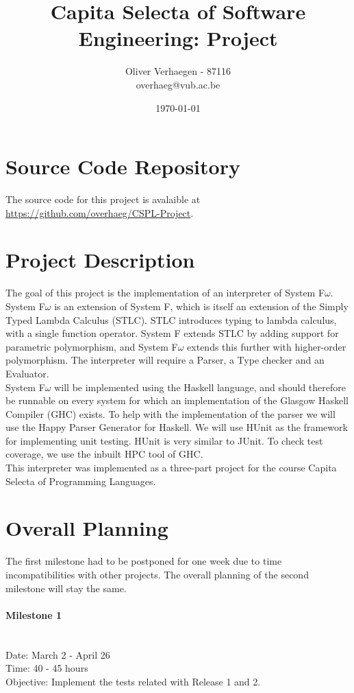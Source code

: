 \documentclass[pdftex,11pt,a4paper]{article}
\author{Oliver Verhaegen - 87116\\
overhaeg@vub.ac.be}
\title{Capita Selecta of Software Engineering: Project}
\date{\today}
\begin{document}
\maketitlepage


\section{Source Code Repository}

The source code for this project is avalaible at \url{https://github.com/overhaeg/CSPL-Project}.

\section{Project Description}

The goal of this project is the implementation of an interpreter of System F$\omega$. System F$\omega$ is an extension of System F, which is itself an extension of 
the Simply Typed Lambda Calculus (STLC). STLC introduces typing to lambda calculus, with a single function operator. 
System F extends STLC by adding support for parametric polymorphism, and System F$\omega$ extends this further with higher-order polymorphism. 
The interpreter will require a Parser, a Type checker and an Evaluator.\\
\noindent
System F$\omega$ will be implemented using the Haskell language, and should therefore be runnable on every system for which an implementation of the Glasgow Haskell Compiler (GHC) exists.
To help with the implementation of the parser we will use the Happy Parser Generator for Haskell. We will use HUnit as the framework for implementing unit testing. HUnit is very similar to JUnit. 
To check test coverage, we use the inbuilt HPC tool of GHC. \\
This interpreter was implemented as a three-part project for the course Capita Selecta of Programming Languages. 


\section{Overall Planning}
The first milestone had to be postponed for one week due to time incompatibilities with other projects. The overall planning of the second milestone will stay the same. 

\paragraph{Milestone 1} \mbox{}\\
Date: March 2 - April 26\\
Time: 40 - 45 hours\\
Objective: Implement the tests related with Release 1 and 2.
\end{document}
